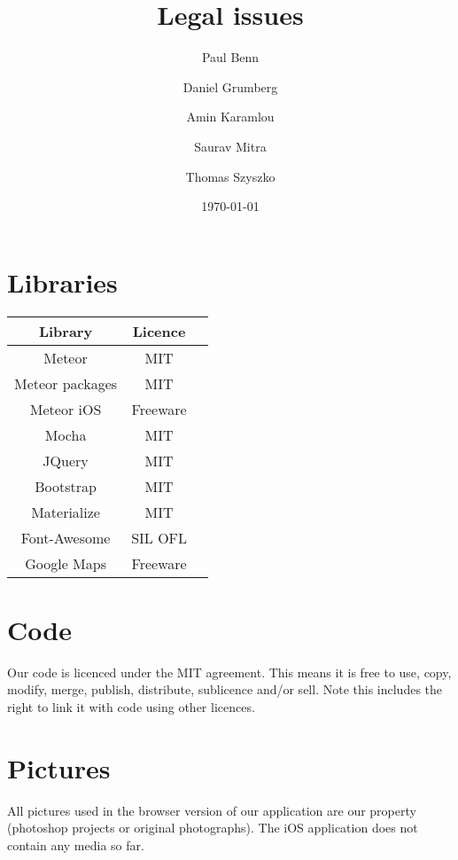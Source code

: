 \documentclass[a4wide, 11pt]{article}
\begin{document}
\title{Legal issues}

\author{Paul Benn \and Daniel Grumberg \and Amin Karamlou \and Saurav Mitra \and Thomas Szyszko }

\date{\today}


\clearpage

\section{Libraries}

\begin{center}
	\begin{tabular}{ |c|c|c| } 
		\hline
		\textbf{Library} & \textbf{Licence} \\
		\hline 
		Meteor & MIT \\ 
		\hline
		Meteor packages & MIT \\ 
		\hline
		Meteor iOS & Freeware \\ 
		\hline
		Mocha & MIT \\ 
		\hline
		JQuery & MIT \\ 
		\hline
		Bootstrap & MIT \\ 
		\hline
		Materialize & MIT \\ 
		\hline
		Font-Awesome & SIL OFL \\ 
		\hline
		Google Maps & Freeware \\ 
		\hline
	\end{tabular}
\end{center}

\section{Code}

Our code is licenced under the MIT agreement. This means it is free to use, copy, modify, merge, publish, distribute, sublicence and/or sell. Note this includes the right to link it with code using other licences.

\section{Pictures}

All pictures used in the browser version of our application are our property (photoshop projects or original photographs). The iOS application does not contain any media so far.
\end{document}
